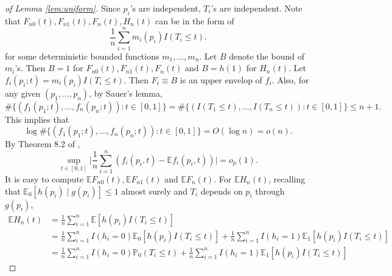 \documentclass{biometrika}
\newcommand{\E}{\mathbb{E}}
\renewcommand{\P}{\mathbb{P}}
\newcommand{\1}{\mathbf{1}}
\begin{document}
\begin{proof}[of Lemma \ref{lem:uniform}]
Since $p_{i}$'s are independent, $T_{i}$'s are independent. Note that $F_{n0}(t), F_{n1}(t), F_{n}(t), H_{n}(t)$ can be in the form of 
\[\frac{1}{n}\sum_{i=1}^{n}m_{i}(p_{i})I(T_{i}\le t).\]
for some deterministic bounded functions $m_{1}, \ldots, m_{n}$. Let $B$ denote the bound of $m_{i}$'s. Then $B = 1$ for $F_{n0}(t), F_{n1}(t), F_{n}(t)$ and $B = h(1)$ for $H_{n}(t)$. Let $f_{i}(p_{i}; t) = m_{i}(p_{i})I(T_{i}\le t)$. Then $F_{i}\equiv B$ is an upper envelop of $f_{i}$. Also, for any given $(p_{1}, \ldots, p_{n})$, by Sauer's lemma,
\[\#\{(f_{1}(p_{1}; t), \ldots, f_{n}(p_{n}; t)): t\in [0, 1]\} = \#\{(I(T_{1}\le t), \ldots, I(T_{n}\le t)): t\in [0, 1]\}\le n + 1.\]
This implies that
\[\log \#\{(f_{1}(p_{1}; t), \ldots, f_{n}(p_{n}; t)): t\in [0, 1]\} = O(\log n) = o(n).\]
By Theorem 8.2 of \cite{pollard1990empirical}, 
\[\sup_{t\in [0, 1]}\bigg|\frac{1}{n}\sum_{i=1}^{n}(f_{i}(p_{i}, t) - \E f_{i}(p_{i}, t))\bigg| = o_{p}(1).\]
It is easy to compute $\E F_{n0}(t), \E F_{n1}(t)$ and $\E F_{n}(t)$. For $\E H_{n}(t)$, recalling that $\E_{0} [h(p_{i})\mid g(p_{i})] \le 1$ almost surely and $T_{i}$ depends on $p_{i}$ through $g(p_{i})$,
\begin{align*}
  \E H_{n}(t) &= \frac{1}{n}\sum_{i=1}^{n}\E [h(p_{i})I(T_{i}\le t)]\\ 
& = \frac{1}{n}\sum_{i=1}^{n}I(h_{i} = 0)\E_{0} [h(p_{i})I(T_{i}\le t)] + \frac{1}{n}\sum_{i=1}^{n}I(h_{i} = 1)\E_{1} [h(p_{i})I(T_{i}\le t)]\\
& = \frac{1}{n}\sum_{i=1}^{n}I(h_{i} = 0)\P_{0}(T_{i}\le t) + \frac{1}{n}\sum_{i=1}^{n}I(h_{i} = 1)\E_{1} [h(p_{i})I(T_{i}\le t)]
\end{align*}
\end{proof}
\end{document}
